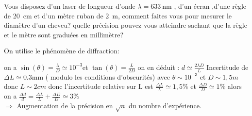 \begin{Exercise}[title=Mesure du diamètre d'un cheveux]
Vous disposez d'un laser de longueur d'onde $\lambda=\SI{633}{\nano\meter}$ , d'un écran ,d'une règle de \SI{20}{\centi\meter} et d'un mètre ruban de \SI{2}{\meter}, comment faites vous pour mesurer le diamètre d'un cheveu?  quelle précision pouvez vous atteindre sachant que la règle et le mètre sont graduées en millimètre?
\end{Exercise}
\begin{Answer}
On utilise le phénomène de diffraction:
	\begin{center}
	
	\end{center}
on a $\sin(\theta)=\frac{\lambda}{D} \simeq 10^{-3} $et $\tan(\theta)=\frac{L}{2D}$ on en déduit : $d \simeq \frac{2\lambda D}{L}$
Incertitude de $\Delta L \simeq 0.3$mm ( modulo les conditions d'obscurités) avec $\theta \sim 10^{-3}$ et $D \sim 1,5m$ donc $L \sim 2cm$
donc l'incertitude relative sur L est $\frac{\Delta L }{L} \simeq 1,5\%$ et $\frac{\Delta D}{D} \simeq 1\%$
alors on a $\frac{\Delta d}{d} = \frac{\Delta L}{L} +\frac{\Delta D}{D} \simeq 3\%$\\
$\Rightarrow$ Augmentation de la précision en $\sqrt{n}$ du nombre d'expérience.
\end{Answer}
